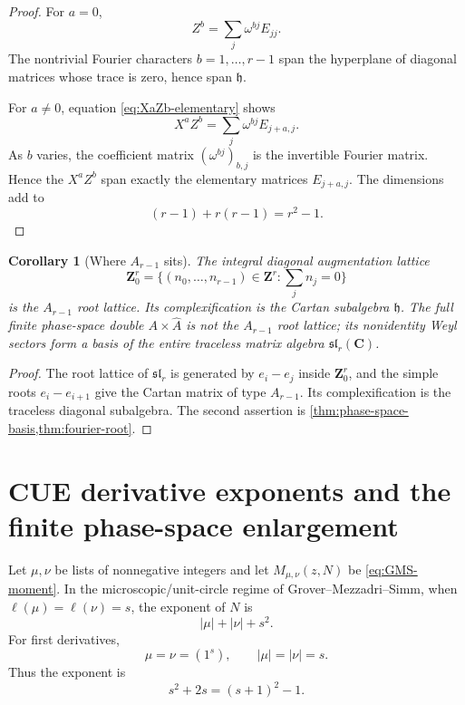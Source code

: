 \documentclass[11pt]{article}
\newcommand{\C}{\mathbf C}
\newcommand{\Z}{\mathbf Z}
\newcommand{\1}{\mathbf 1}
\newtheorem{corollary}[theorem]{Corollary}
\numberwithin{equation}{section}
\begin{document}
\begin{proof}
For $a=0$,
\begin{equation}
  Z^b=\sum_j\omega^{bj}E_{jj}.
\end{equation}
The nontrivial Fourier characters $b=1,\dots,r-1$ span the hyperplane of diagonal matrices whose trace is zero, hence span $\mathfrak h$.

For $a\ne0$, equation \eqref{eq:XaZb-elementary} shows
\begin{equation}
  X^aZ^b=\sum_j\omega^{bj}E_{j+a,j}.
\end{equation}
As $b$ varies, the coefficient matrix $(\omega^{bj})_{b,j}$ is the invertible Fourier matrix.  Hence the $X^aZ^b$ span exactly the elementary matrices $E_{j+a,j}$.  The dimensions add to
\begin{equation}
  (r-1)+r(r-1)=r^2-1.
\end{equation}
\end{proof}

\begin{corollary}[Where $A_{r-1}$ sits]\label{cor:A-root-lattice}
The integral diagonal augmentation lattice
\begin{equation}
  \Z^r_0=\{(n_0,
\dots,n_{r-1})\in\Z^r:\sum_jn_j=0\}
\end{equation}
is the $A_{r-1}$ root lattice.  Its complexification is the Cartan subalgebra $\mathfrak h$.  The full finite phase-space double $A\times\widehat A$ is not the $A_{r-1}$ root lattice; its nonidentity Weyl sectors form a basis of the entire traceless matrix algebra $\mathfrak{sl}_r(\C)$.
\end{corollary}

\begin{proof}
The root lattice of $\mathfrak{sl}_r$ is generated by $e_i-e_j$ inside $\Z^r_0$, and the simple roots $e_i-e_{i+1}$ give the Cartan matrix of type $A_{r-1}$.  Its complexification is the traceless diagonal subalgebra.  The second assertion is \cref{thm:phase-space-basis,thm:fourier-root}.
\end{proof}

\section{CUE derivative exponents and the finite phase-space enlargement}\label{sec:CUE-exponent}

Let $\mu,\nu$ be lists of nonnegative integers and let $M_{\mu,\nu}(z,N)$ be \eqref{eq:GMS-moment}.  In the microscopic/unit-circle regime of Grover--Mezzadri--Simm, when $\ell(\mu)=\ell(\nu)=s$, the exponent of $N$ is
\begin{equation}
  |\mu|+|\nu|+s^2.
\end{equation}
For first derivatives,
\begin{equation}
  \mu=\nu=(1^s),
  \qquad |\mu|=|\nu|=s.
\end{equation}
Thus the exponent is
\begin{equation}
  s^2+2s=(s+1)^2-1.
\end{equation}
\end{document}
